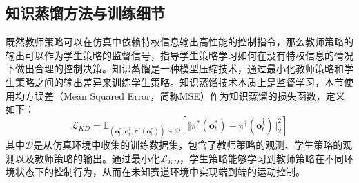 \subsection{知识蒸馏方法与训练细节}
既然教师策略可以在仿真中依赖特权信息输出高性能的控制指令，那么教师策略的输出可以作为学生策略的监督信号，指导学生策略学习如何在没有特权信息的情况下做出合理的控制决策。知识蒸馏是一种模型压缩技术，通过最小化教师策略和学生策略之间的输出差异来训练学生策略。知识蒸馏技术本质上是监督学习，本节使用均方误差（Mean Squared Error，简称MSE）作为知识蒸馏的损失函数，定义如下：
\begin{equation}
\mathcal{L}_{KD}=\mathbb{E}_{(\boldsymbol{o}^\ast_t,\boldsymbol{o}^\dagger_t, \pi^\ast(\boldsymbol{o}^\ast_t))\sim\mathcal{D}}\left[\Vert\pi^\ast(\boldsymbol{o}^\ast_t)-\pi^\dagger(\boldsymbol{o}^\dagger_t)\Vert_2^2\right]
\label{equ:imitation-loss}
\end{equation}其中$\mathcal{D}$是从仿真环境中收集的训练数据集，包含了教师策略的观测、学生策略的观测以及教师策略的输出。通过最小化$\mathcal{L}_{KD}$，学生策略能够学习到教师策略在不同环境状态下的控制行为，从而在未知赛道环境中实现端到端的运动控制。

